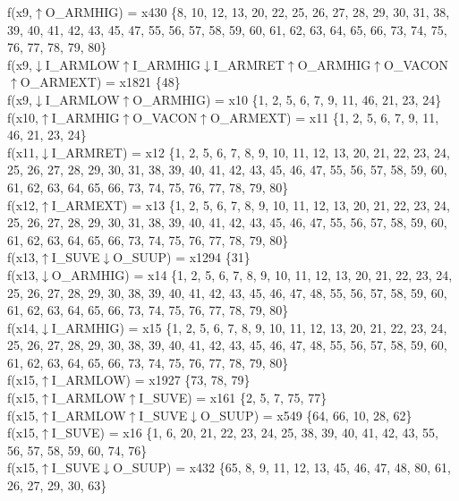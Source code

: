 f(x9,$\uparrow$O\_ARMHIG) = x430 \{8, 10, 12, 13, 20, 22, 25, 26, 27, 28, 29, 30, 31, 38, 39, 40, 41, 42, 43, 45, 47, 55, 56, 57, 58, 59, 60, 61, 62, 63, 64, 65, 66, 73, 74, 75, 76, 77, 78, 79, 80\} \\  
f(x9,$\downarrow$I\_ARMLOW$\uparrow$I\_ARMHIG$\downarrow$I\_ARMRET$\uparrow$O\_ARMHIG$\uparrow$O\_VACON$\uparrow$O\_ARMEXT) = x1821 \{48\} \\  
f(x9,$\downarrow$I\_ARMLOW$\uparrow$O\_ARMHIG) = x10 \{1, 2, 5, 6, 7, 9, 11, 46, 21, 23, 24\} \\  
f(x10,$\uparrow$I\_ARMHIG$\uparrow$O\_VACON$\uparrow$O\_ARMEXT) = x11 \{1, 2, 5, 6, 7, 9, 11, 46, 21, 23, 24\} \\  
f(x11,$\downarrow$I\_ARMRET) = x12 \{1, 2, 5, 6, 7, 8, 9, 10, 11, 12, 13, 20, 21, 22, 23, 24, 25, 26, 27, 28, 29, 30, 31, 38, 39, 40, 41, 42, 43, 45, 46, 47, 55, 56, 57, 58, 59, 60, 61, 62, 63, 64, 65, 66, 73, 74, 75, 76, 77, 78, 79, 80\} \\  
f(x12,$\uparrow$I\_ARMEXT) = x13 \{1, 2, 5, 6, 7, 8, 9, 10, 11, 12, 13, 20, 21, 22, 23, 24, 25, 26, 27, 28, 29, 30, 31, 38, 39, 40, 41, 42, 43, 45, 46, 47, 55, 56, 57, 58, 59, 60, 61, 62, 63, 64, 65, 66, 73, 74, 75, 76, 77, 78, 79, 80\} \\  
f(x13,$\uparrow$I\_SUVE$\downarrow$O\_SUUP) = x1294 \{31\} \\  
f(x13,$\downarrow$O\_ARMHIG) = x14 \{1, 2, 5, 6, 7, 8, 9, 10, 11, 12, 13, 20, 21, 22, 23, 24, 25, 26, 27, 28, 29, 30, 38, 39, 40, 41, 42, 43, 45, 46, 47, 48, 55, 56, 57, 58, 59, 60, 61, 62, 63, 64, 65, 66, 73, 74, 75, 76, 77, 78, 79, 80\} \\  
f(x14,$\downarrow$I\_ARMHIG) = x15 \{1, 2, 5, 6, 7, 8, 9, 10, 11, 12, 13, 20, 21, 22, 23, 24, 25, 26, 27, 28, 29, 30, 38, 39, 40, 41, 42, 43, 45, 46, 47, 48, 55, 56, 57, 58, 59, 60, 61, 62, 63, 64, 65, 66, 73, 74, 75, 76, 77, 78, 79, 80\} \\  
f(x15,$\uparrow$I\_ARMLOW) = x1927 \{73, 78, 79\} \\  
f(x15,$\uparrow$I\_ARMLOW$\uparrow$I\_SUVE) = x161 \{2, 5, 7, 75, 77\} \\  
f(x15,$\uparrow$I\_ARMLOW$\uparrow$I\_SUVE$\downarrow$O\_SUUP) = x549 \{64, 66, 10, 28, 62\} \\  
f(x15,$\uparrow$I\_SUVE) = x16 \{1, 6, 20, 21, 22, 23, 24, 25, 38, 39, 40, 41, 42, 43, 55, 56, 57, 58, 59, 60, 74, 76\} \\  
f(x15,$\uparrow$I\_SUVE$\downarrow$O\_SUUP) = x432 \{65, 8, 9, 11, 12, 13, 45, 46, 47, 48, 80, 61, 26, 27, 29, 30, 63\} \\  
